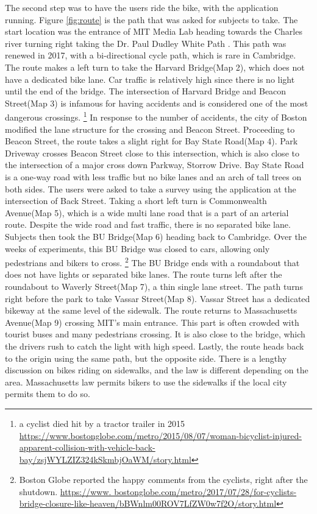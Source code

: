 The second step was to have the users ride the bike, with the application running. Figure \ref{fig:route} is the path that was asked for subjects to take. The start location was the entrance of MIT Media Lab heading towards the Charles river turning right taking the Dr. Paul Dudley White Path . This path was renewed in 2017, with a bi-directional cycle path, which is rare in Cambridge. The route makes a left turn to take the Harvard Bridge(Map 2), which does not have a dedicated bike lane. Car traffic is relatively high since there is no light until the end of the bridge. The intersection of Harvard Bridge and Beacon Street(Map 3) is infamous for having accidents and is considered one of the most dangerous crossings.
\footnote{a cyclist died hit by a tractor trailer in 2015
\url{https://www.bostonglobe.com/metro/2015/08/07/woman-bicyclist-injured-apparent-collision-with-vehicle-back-bay/zsjWYLZIZ324kSkmbjOaWM/story.html}}
In response to the number of accidents, the city of Boston
modified the lane structure for the crossing and Beacon Street. Proceeding to Beacon Street, the route takes a slight right for Bay State Road(Map 4). Park Driveway crosses Beacon Street close to this intersection, which is also close to the intersection of a major cross down Parkway, Storrow Drive. Bay State Road is a one-way road with less traffic but no bike lanes and an arch of tall trees on both sides. The users were asked to take a survey using the application at the intersection of Back Street. Taking a short left turn is Commonwealth Avenue(Map 5), which is a wide multi lane road that is a part of an arterial route. Despite the wide road and fast traffic, there is no separated bike lane. Subjects then took the BU Bridge(Map 6) heading back to Cambridge. Over the weeks of experiments, this BU Bridge was closed to cars, allowing only pedestrians and bikers to cross.
\footnote{
Boston Globe reported the happy comments from the cyclists, right after the shutdown. 
\url{https://www. bostonglobe.com/metro/2017/07/28/for-cyclists-bridge-closure-like-heaven/bBWnlm00ROV7LfZW0w7f2O/story.html}
}
The BU Bridge ends with a roundabout that does not have lights or separated bike lanes. The route turns left after the roundabout to Waverly Street(Map 7), a thin single lane street. The path turns right before the park to take Vassar Street(Map 8). Vassar Street has a dedicated bikeway at the same level of the sidewalk. The route returns to Massachusetts Avenue(Map 9) crossing MIT's main entrance. This part is often crowded with tourist buses and many pedestrians crossing. It is also close to the bridge, which the drivers rush to catch the light with high speed. Lastly, the route heads back to the origin using the same path, but the opposite side. There is a lengthy discussion on bikes riding on sidewalks, and the law is different depending on the area. Massachusetts law permits bikers to use the sidewalks if the local city permits them to do so.
